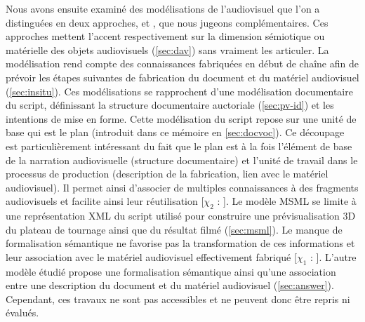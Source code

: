 Nous avons ensuite examiné des modélisations de l'audiovisuel que l'on a distinguées en deux approches,  et , que nous jugeons complémentaires. 
Ces approches mettent l'accent respectivement sur la dimension sémiotique ou matérielle des objets audiovisuels (\ref{sec:dav}) sans vraiment les articuler.
La modélisation  rend compte des connaissances fabriquées en début de chaîne afin de prévoir les étapes suivantes de fabrication du document et du matériel audiovisuel (\ref{sec:insitu}).
Ces modélisations se rapprochent d'une modélisation documentaire du script, définissant la structure documentaire auctoriale (\ref{sec:pv-id}) et les intentions de mise en forme.
Cette modélisation du script repose sur une unité de base qui est le plan (introduit dans ce mémoire en \ref{sec:docvoc}).
Ce découpage est particulièrement intéressant du fait que le plan est à la fois l'élément de base de la narration audiovisuelle (structure documentaire) et l'unité de travail dans le processus de production (description de la fabrication, lien avec le matériel audiovisuel). 
Il permet ainsi d'associer de multiples connaissances à des fragments audiovisuels et facilite ainsi leur réutilisation [$\chi_2$ : ].
Le modèle MSML se limite à une représentation XML du script utilisé pour construire une prévisualisation 3D du plateau de tournage ainsi que du résultat filmé (\ref{sec:msml}). 
Le manque de formalisation sémantique ne favorise pas la transformation de ces informations et leur association avec le matériel audiovisuel effectivement fabriqué [$\chi_1$ : ].
L'autre modèle étudié propose une formalisation sémantique ainsi qu'une association entre une description du document et du matériel audiovisuel (\ref{sec:answer}).
Cependant, ces travaux ne sont pas accessibles et ne peuvent donc être repris ni évalués.

